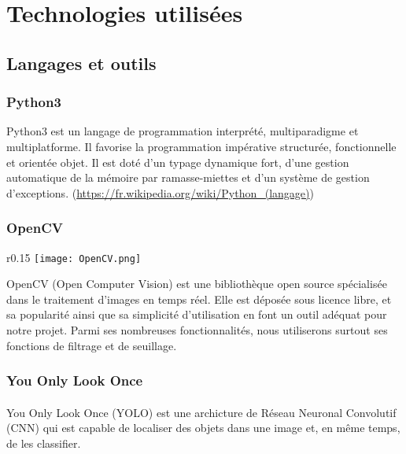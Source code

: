 \documentclass[a4paper]{article}
\begin{document}
	\section{Technologies utilisées} 
		\subsection{Langages et outils}
			\subsubsection{Python3}
				Python3 est un langage de programmation interprété, multiparadigme et multiplatforme. Il favorise la programmation impérative structurée, fonctionnelle et orientée objet. Il est doté d'un typage dynamique fort, d'une gestion automatique de la mémoire par ramasse-miettes et d'un système de gestion d'exceptions. (\url{https://fr.wikipedia.org/wiki/Python_(langage)})

			\subsubsection{OpenCV}
				\begin{wrapfigure}{r}{0.15\textwidth}
					\texttt{[image: OpenCV.png]}
				\end{wrapfigure}
				OpenCV (Open Computer Vision) est une bibliothèque open source spécialisée dans le traitement d'images en temps réel.
				Elle est déposée sous licence libre, et sa popularité ainsi que sa simplicité d'utilisation en font un outil adéquat pour notre projet.
				Parmi ses nombreuses fonctionnalités, nous utiliserons surtout ses fonctions de filtrage et de seuillage.
				
			\subsubsection{You Only Look Once}
				\paragraph{}
				You Only Look Once (YOLO) est une archicture de Réseau Neuronal Convolutif (CNN) qui est capable de localiser des objets dans une image et, en même temps, de les classifier.
\end{document}
